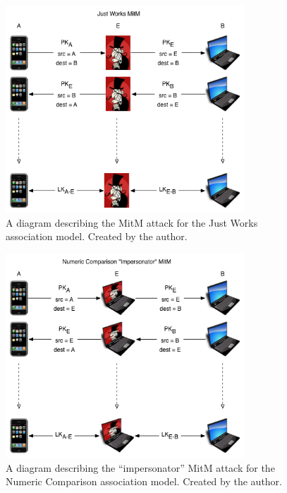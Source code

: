 \documentclass{acm_proc_article-sp}
\begin{document}
\begin{figure}
    \begin{center}
        \includegraphics[width=0.8\textwidth]{diagrams/jw_mitm.png}
        \caption{A diagram describing the MitM attack for the Just Works association model. Created by the author.}
        \label{jw_mitm}
    \end{center}
\end{figure}

\begin{figure}
    \begin{center}
        \includegraphics[width=0.8\textwidth]{diagrams/nc_impersonator_mitm.png}
        \caption{A diagram describing the ``impersonator'' MitM attack for the Numeric Comparison association model. Created by the author.}
        \label{nc_impersonator_mitm}
    \end{center}
\end{figure}
\end{document}
